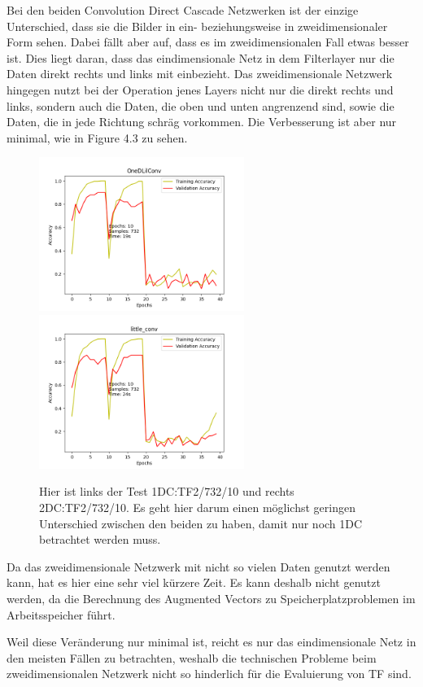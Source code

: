 Bei den beiden Convolution Direct Cascade Netzwerken ist der einzige Unterschied, dass sie die Bilder in ein- beziehungsweise in 
zweidimensionaler Form sehen. Dabei fällt aber auf, dass es im zweidimensionalen Fall etwas besser ist. 
Dies liegt daran, dass das eindimensionale Netz in dem Filterlayer nur die Daten direkt rechts und links mit einbezieht. Das 
zweidimensionale Netzwerk hingegen nutzt bei der Operation jenes Layers nicht nur die direkt rechts und links, sondern auch die Daten, 
die oben und unten angrenzend sind, sowie die Daten, die in jede Richtung schräg vorkommen. 
Die Verbesserung ist aber nur minimal, wie in Figure 4.3 zu sehen. 

\begin{figure}[htpb]
    \includegraphics[height=5cm]{../../Plots/ba_plots/dimensionality/1dim_tr.png}
    \includegraphics[height=5cm]{../../Plots/ba_plots/dimensionality/2dim_tr.png}
    \caption{\label{fig:dim} 
    \small{Hier ist links der Test 1DC:TF2/732/10 und rechts 2DC:TF2/732/10. Es geht hier darum einen möglichst geringen Unterschied 
    zwischen den beiden zu haben, damit nur noch 1DC betrachtet werden muss.}}
\end{figure}

Da das zweidimensionale Netzwerk mit nicht so vielen Daten genutzt werden kann, hat es hier eine sehr viel kürzere Zeit. Es kann deshalb 
nicht genutzt werden, da die Berechnung des Augmented Vectors zu Speicherplatzproblemen im Arbeitsspeicher führt. 

Weil diese Veränderung nur minimal ist, reicht es nur das eindimensionale Netz in den meisten Fällen zu betrachten, weshalb die technischen 
Probleme beim zweidimensionalen Netzwerk nicht so hinderlich für die Evaluierung von TF sind. 
